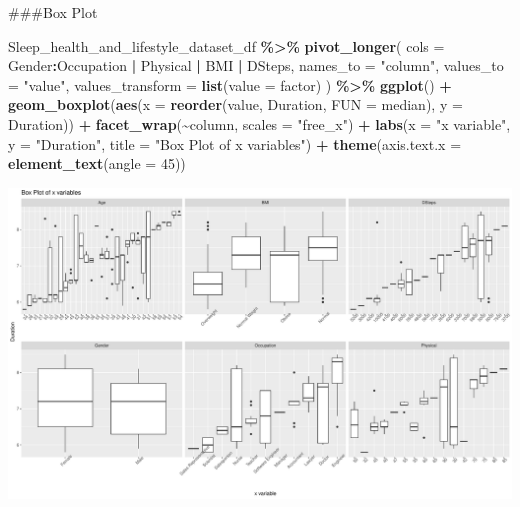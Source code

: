 \documentclass[
  11pt,
]{article}
\newenvironment{Shaded}{\begin{snugshade}}{\end{snugshade}}
\newcommand{\AttributeTok}[1]{\textcolor[rgb]{0.13,0.29,0.53}{#1}}
\newcommand{\DecValTok}[1]{\textcolor[rgb]{0.00,0.00,0.81}{#1}}
\newcommand{\FunctionTok}[1]{\textcolor[rgb]{0.13,0.29,0.53}{\textbf{#1}}}
\newcommand{\NormalTok}[1]{#1}
\newcommand{\SpecialCharTok}[1]{\textcolor[rgb]{0.81,0.36,0.00}{\textbf{#1}}}
\newcommand{\StringTok}[1]{\textcolor[rgb]{0.31,0.60,0.02}{#1}}
\begin{document}
\#\#\#Box Plot

\begin{Shaded}
\begin{Highlighting}[]
\NormalTok{Sleep\_health\_and\_lifestyle\_dataset\_df }\SpecialCharTok{\%\textgreater{}\%}
  \FunctionTok{pivot\_longer}\NormalTok{(}
    \AttributeTok{cols =}\NormalTok{ Gender}\SpecialCharTok{:}\NormalTok{Occupation }\SpecialCharTok{|}\NormalTok{ Physical }\SpecialCharTok{|}\NormalTok{ BMI }\SpecialCharTok{|}\NormalTok{ DSteps,}
    \AttributeTok{names\_to =} \StringTok{"column"}\NormalTok{,}
    \AttributeTok{values\_to =} \StringTok{"value"}\NormalTok{,}
    \AttributeTok{values\_transform =} \FunctionTok{list}\NormalTok{(}\AttributeTok{value =} \StringTok{\textquotesingle{}factor\textquotesingle{}}\NormalTok{)}
\NormalTok{) }\SpecialCharTok{\%\textgreater{}\%}
\FunctionTok{ggplot}\NormalTok{() }\SpecialCharTok{+}
  \FunctionTok{geom\_boxplot}\NormalTok{(}\FunctionTok{aes}\NormalTok{(}\AttributeTok{x =} \FunctionTok{reorder}\NormalTok{(value, Duration, }\AttributeTok{FUN =}\NormalTok{ median), }\AttributeTok{y =}\NormalTok{ Duration)) }\SpecialCharTok{+}
  \FunctionTok{facet\_wrap}\NormalTok{(}\SpecialCharTok{\textasciitilde{}}\NormalTok{column, }\AttributeTok{scales =} \StringTok{"free\_x"}\NormalTok{) }\SpecialCharTok{+}
  \FunctionTok{labs}\NormalTok{(}\AttributeTok{x =} \StringTok{"x variable"}\NormalTok{, }\AttributeTok{y =} \StringTok{"Duration"}\NormalTok{, }\AttributeTok{title =} \StringTok{"Box Plot of x variables"}\NormalTok{) }\SpecialCharTok{+}
  \FunctionTok{theme}\NormalTok{(}\AttributeTok{axis.text.x =} \FunctionTok{element\_text}\NormalTok{(}\AttributeTok{angle =} \DecValTok{45}\NormalTok{))}
\end{Highlighting}
\end{Shaded}

\begin{center}\includegraphics[width=0.7\linewidth]{SleepHelath_files/figure-latex/unnamed-chunk-38-1} \end{center}
\end{document}
